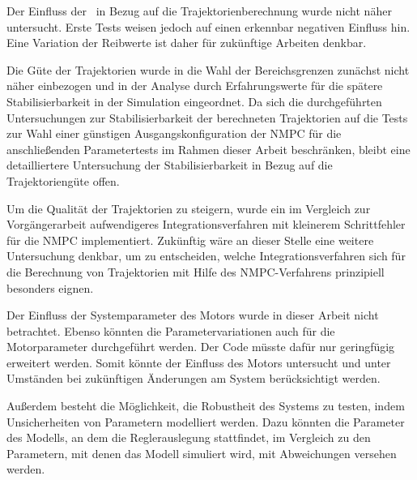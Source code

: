 Der Einfluss der \crb\ in Bezug auf die Trajektorienberechnung wurde nicht näher untersucht. Erste Tests weisen jedoch auf einen erkennbar negativen Einfluss hin. Eine Variation der Reibwerte ist daher für zukünftige Arbeiten denkbar.

Die Güte der Trajektorien wurde in die Wahl der Bereichsgrenzen zunächst nicht näher einbezogen und in der Analyse durch Erfahrungswerte für die spätere Stabilisierbarkeit in der Simulation eingeordnet. Da sich die durchgeführten Untersuchungen zur Stabilisierbarkeit der berechneten Trajektorien auf die Tests zur Wahl einer günstigen Ausgangskonfiguration der NMPC für die anschließenden Parametertests im Rahmen dieser Arbeit beschränken, bleibt eine detailliertere Untersuchung der Stabilisierbarkeit in Bezug auf die Trajektoriengüte offen.

Um die Qualität der Trajektorien zu steigern, wurde ein im Vergleich zur Vorgängerarbeit aufwendigeres Integrationsverfahren mit kleinerem Schrittfehler für die NMPC implementiert. Zukünftig wäre an dieser Stelle eine weitere Untersuchung denkbar, um zu entscheiden, welche Integrationsverfahren sich für die Berechnung von Trajektorien mit Hilfe des NMPC-Verfahrens prinzipiell besonders eignen. 

Der Einfluss der Systemparameter des Motors wurde in dieser Arbeit nicht betrachtet.
Ebenso könnten die Parametervariationen auch für die Motorparameter durchgeführt werden.
Der Code müsste dafür nur geringfügig erweitert werden.
Somit könnte der Einfluss des Motors untersucht und unter Umständen bei zukünftigen Änderungen am System berücksichtigt werden.

Außerdem besteht die Möglichkeit, die Robustheit des Systems zu testen, indem Unsicherheiten von Parametern modelliert werden.
Dazu könnten die Parameter des Modells, an dem die Reglerauslegung stattfindet, im Vergleich zu den Parametern, mit denen das Modell simuliert wird, mit Abweichungen versehen werden.
